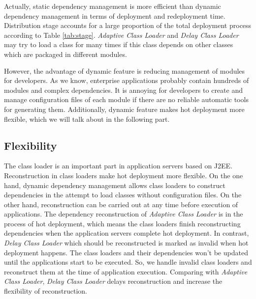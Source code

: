 \documentclass[conference]{IEEEtran}
\begin{document}
Actually, static dependency management is more efficient than dynamic dependency management in terms of deployment and redeployment time.
Distribution stage accounts for a large proportion of the total deployment process according to Table \ref{tab:stage}.
\emph{Adaptive Class Loader} and \emph{Delay Class Loader} may try to load a class for many times if this class depends on other classes which are packaged in different modules.

However, the advantage of dynamic feature is reducing management of modules for developers.
As we know, enterprise applications probably contain hundreds of modules and complex dependencies.
It is annoying for developers to create and manage configuration files of each module if there are no reliable automatic tools for generating them.
Additionally, dynamic feature makes hot deployment more flexible, which we will talk about in the following part.


\subsection{Flexibility}

The class loader is an important part in application servers based on J2EE.
Reconstruction in class loaders make hot deployment more flexible.
On the one hand, dynamic dependency management allows class loaders to construct dependencies in the attempt to load classes without configuration files.
On the other hand, reconstruction can be carried out at any time before execution of applications.
The dependency reconstruction of \emph{Adaptive Class Loader} is in the process of hot deployment, which means the class loaders finish reconstructing dependencies when the application servers complete hot deployment.
In contrast, \emph{Delay Class Loader} which should be reconstructed is marked as invalid when hot deployment happens.
The class loaders and their dependencies won't be updated until the applications start to be executed.
So, we handle invalid class loaders and reconstruct them at the time of application execution.
Comparing with \emph{Adaptive Class Loader}, \emph{Delay Class Loader} delays reconstruction and increase the flexibility of reconstruction.
\end{document}

